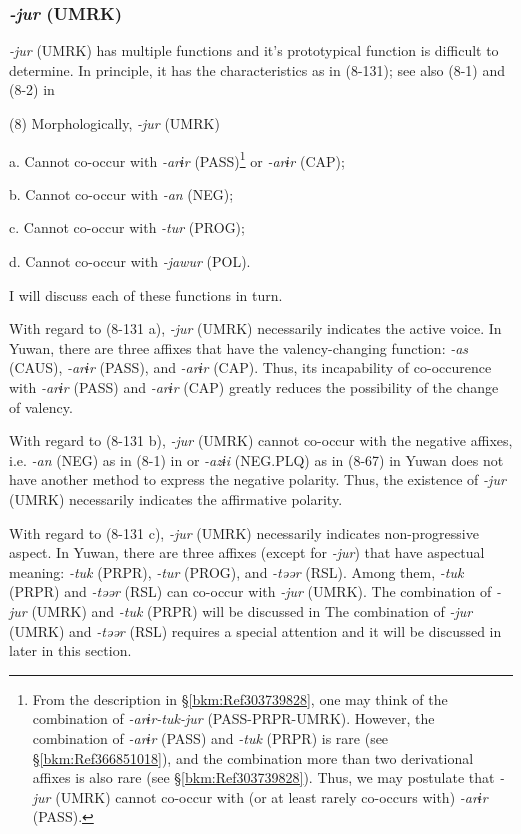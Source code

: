 \subsubsection{\textit{{}-jur} (UMRK)}

\textit{{}-jur} (UMRK) has multiple functions and it’s prototypical function is difficult to determine. In principle, it has the characteristics as in (8-131); see also (8-1) and (8-2) in 

(8)  Morphologically, \textit{{}-jur} (UMRK)

  a.  Cannot co-occur with \textit{{}-arɨr} (PASS)\footnote{From the description in §\ref{bkm:Ref303739828}, one may think of the combination of \textit{{}-arɨr-tuk-jur} (PASS-PRPR-UMRK). However, the combination of \textit{{}-arɨr} (PASS) and \textit{{}-tuk} (PRPR) is rare (see §\ref{bkm:Ref366851018}), and the combination more than two derivational affixes is also rare (see §\ref{bkm:Ref303739828}). Thus, we may postulate that \textit{{}-jur} (UMRK) cannot co-occur with (or at least rarely co-occurs with) \textit{{}-arɨr} (PASS).} or \textit{{}-arɨr} (CAP);

  b.  Cannot co-occur with \textit{{}-an} (NEG);

  c.  Cannot co-occur with \textit{{}-tur} (PROG);

  d.  Cannot co-occur with \textit{{}-jawur} (POL).

I will discuss each of these functions in turn.

With regard to (8-131 a), \textit{{}-jur} (UMRK) necessarily indicates the active voice. In Yuwan, there are three affixes that have the valency-changing function: \textit{-as} (CAUS), \textit{{}-arɨr} (PASS), and \textit{{}-arɨr} (CAP). Thus, its incapability of co-occurence with \textit{{}-arɨr} (PASS) and \textit{{}-arɨr} (CAP) greatly reduces the possibility of the change of valency.

With regard to (8-131 b), \textit{{}-jur} (UMRK) cannot co-occur with the negative affixes, i.e. \textit{{}-an} (NEG) as in (8-1) in  or \textit{{}-azɨi} (NEG.PLQ) as in (8-67) in  Yuwan does not have another method to express the negative polarity. Thus, the existence of \textit{{}-jur} (UMRK) necessarily indicates the affirmative polarity.

  With regard to (8-131 c), \textit{{}-jur} (UMRK) necessarily indicates non-progressive aspect. In Yuwan, there are three affixes (except for \textit{{}-jur}) that have aspectual meaning: \textit{{}-tuk} (PRPR), \textit{{}-tur} (PROG), and \textit{{}-təər} (RSL). Among them, \textit{{}-tuk} (PRPR) and \textit{{}-təər} (RSL) can co-occur with \textit{{}-jur} (UMRK). The combination of \textit{{}-jur} (UMRK) and \textit{{}-tuk} (PRPR) will be discussed in  The combination of \textit{{}-jur} (UMRK) and \textit{{}-təər} (RSL) requires a special attention and it will be discussed in later in this section.

